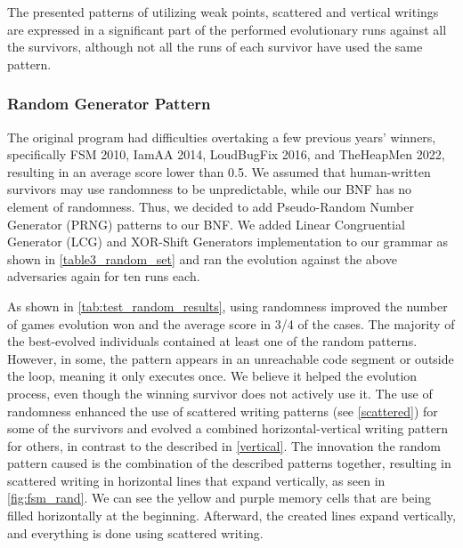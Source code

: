 \documentclass[dvipsnames, format=sigconf]{acmart}
\begin{document}
The presented patterns of utilizing weak points, scattered and vertical writings are expressed in a significant part of the performed evolutionary runs against all the survivors, although not all the runs of each survivor have used the same pattern.

\subsubsection{Random Generator Pattern}
The original program had difficulties overtaking a few previous years' winners, specifically FSM 2010, IamAA 2014, LoudBugFix 2016, and TheHeapMen 2022, resulting in an average score lower than 0.5. We assumed that human-written survivors may use randomness to be unpredictable, while our BNF has no element of randomness. Thus, we decided to add Pseudo-Random Number Generator (PRNG) patterns to our BNF. We added Linear Congruential Generator (LCG) and XOR-Shift Generators implementation to our grammar as shown in \autoref{table3_random_set} and ran the evolution against the above adversaries again for ten runs each.


As shown in \autoref{tab:test_random_results}, using randomness improved the number of games evolution won and the average score in 3/4 of the cases.
The majority of the best-evolved individuals contained at least one of the random patterns. However, in some, the pattern appears in an unreachable code segment or outside the loop, meaning it only executes once. We believe it helped the evolution process, even though the winning survivor does not actively use it.
The use of randomness enhanced the use of scattered writing patterns (see \autoref{scattered}) for some of the survivors and evolved a combined horizontal-vertical writing pattern for others, in contrast to the described in \autoref{vertical}. The innovation the random pattern caused is the combination of the described patterns together, resulting in scattered writing in horizontal lines that expand vertically, as seen in \autoref{fig:fsm_rand}. We can see the yellow and purple memory cells that are being filled horizontally at the beginning. Afterward, the created lines expand vertically, and everything is done using scattered writing.   
\end{document}
